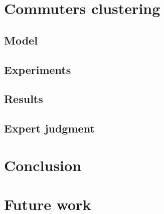 \documentclass{article}
\begin{document}
\newpage
\section{Commuters clustering}
\subsection{Model}

\subsection{Experiments}

\subsection{Results}

\subsection{Expert judgment}


\newpage
\section{Conclusion}


\newpage
\section{Future work}

\newpage
{}

\end{document}
